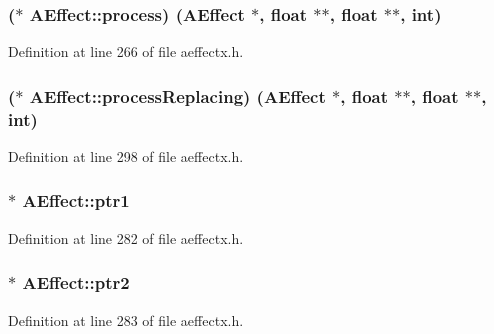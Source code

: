 \subsubsection[{\texorpdfstring{process}{process}}]{($\ast$  A\+Effect\+::process) ({\bf A\+Effect} $\ast$, float $\ast$$\ast$, float $\ast$$\ast$, {\bf int})}\hypertarget{class_a_effect_ae525abf807ced8ef2e895a73392fdb47}{}\label{class_a_effect_ae525abf807ced8ef2e895a73392fdb47}


Definition at line 266 of file aeffectx.\+h.

\subsubsection[{\texorpdfstring{process\+Replacing}{processReplacing}}]{($\ast$  A\+Effect\+::process\+Replacing) ({\bf A\+Effect} $\ast$, float $\ast$$\ast$, float $\ast$$\ast$, {\bf int})}\hypertarget{class_a_effect_a13bd3d939086f0c3aeab85e4265ff94b}{}\label{class_a_effect_a13bd3d939086f0c3aeab85e4265ff94b}


Definition at line 298 of file aeffectx.\+h.

\subsubsection[{\texorpdfstring{ptr1}{ptr1}}]{$\ast$ A\+Effect\+::ptr1}\hypertarget{class_a_effect_a1acdc1cf1f6e217bbaecdd6e5227c49a}{}\label{class_a_effect_a1acdc1cf1f6e217bbaecdd6e5227c49a}


Definition at line 282 of file aeffectx.\+h.

\subsubsection[{\texorpdfstring{ptr2}{ptr2}}]{$\ast$ A\+Effect\+::ptr2}\hypertarget{class_a_effect_a0f6b5b9b80ea1e911ea5e96b940e4f63}{}\label{class_a_effect_a0f6b5b9b80ea1e911ea5e96b940e4f63}


Definition at line 283 of file aeffectx.\+h.

